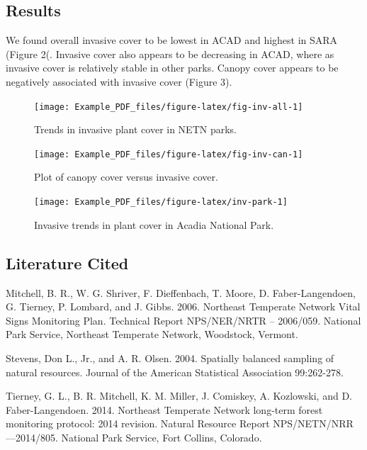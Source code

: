 \documentclass[
  10.5pt,
]{article}
\begin{document}
\hypertarget{results}{%
\subsection{Results}\label{results}}

We found overall invasive cover to be lowest in ACAD and highest in SARA (Figure 2(. Invasive cover also appears to be decreasing in ACAD, where as invasive cover is relatively stable in other parks. Canopy cover appears to be negatively associated with invasive cover (Figure 3).

\begin{figure}

\texttt{[image: Example\_PDF\_files/figure-latex/fig-inv-all-1]} \hfill{}

\caption{Trends in invasive plant cover in NETN parks.}\label{fig:fig-inv-all}
\end{figure}

\begin{figure}

\texttt{[image: Example\_PDF\_files/figure-latex/fig-inv-can-1]} \hfill{}

\caption{Plot of canopy cover versus invasive cover.}\label{fig:fig-inv-can}
\end{figure}

\begin{figure}

\texttt{[image: Example\_PDF\_files/figure-latex/inv-park-1]} \hfill{}

\caption{Invasive trends in plant cover in Acadia National Park.}\label{fig:inv-park}
\end{figure}

\hypertarget{literature-cited}{%
\subsection{Literature Cited}\label{literature-cited}}

\begin{hangparas}{5pt}{1}
Mitchell, B. R., W. G. Shriver, F. Dieffenbach, T. Moore, D. Faber-Langendoen, G. Tierney, P. Lombard, and J. Gibbs. 2006. Northeast Temperate Network Vital Signs Monitoring Plan. Technical Report NPS/NER/NRTR – 2006/059. National Park Service, Northeast Temperate Network, Woodstock, Vermont.

Stevens, Don L., Jr., and A. R. Olsen. 2004. Spatially balanced sampling of natural resources. Journal of the American Statistical Association 99:262-278.

Tierney, G. L., B. R. Mitchell, K. M. Miller, J. Comiskey, A. Kozlowski, and D. Faber-Langendoen. 2014. Northeast Temperate Network long-term forest monitoring protocol: 2014 revision. Natural Resource Report NPS/NETN/NRR—2014/805. National Park Service, Fort Collins, Colorado.
\end{hangparas}
\end{document}
